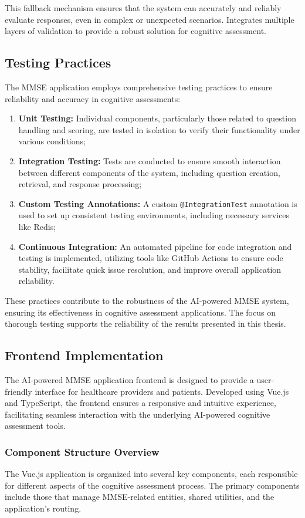 This fallback mechanism ensures that the system can accurately and reliably evaluate responses, even in complex or unexpected scenarios. Integrates multiple layers of validation to provide a robust solution for cognitive assessment.

\subsection{Testing Practices}
The MMSE application employs comprehensive testing practices to ensure reliability and accuracy in cognitive assessments:
\begin{enumerate}
\item \textbf{Unit Testing:} Individual components, particularly those related to question handling and scoring, are tested in isolation to verify their functionality under various conditions;
\item \textbf{Integration Testing:} Tests are conducted to ensure smooth interaction between different components of the system, including question creation, retrieval, and response processing;
\item \textbf{Custom Testing Annotations:} A custom \texttt{@IntegrationTest} annotation is used to set up consistent testing environments, including necessary services like Redis;
\item \textbf{Continuous Integration:} An automated pipeline for code integration and testing is implemented, utilizing tools like GitHub Actions to ensure code stability, facilitate quick issue resolution, and improve overall application reliability.
\end{enumerate}
These practices contribute to the robustness of the AI-powered MMSE system, ensuring its effectiveness in cognitive assessment applications. The focus on thorough testing supports the reliability of the results presented in this thesis.

\subsection{Frontend Implementation}
The AI-powered MMSE application frontend is designed to provide a user-friendly interface for healthcare providers and patients. Developed using Vue.js and TypeScript, the frontend ensures a responsive and intuitive experience, facilitating seamless interaction with the underlying AI-powered cognitive assessment tools.

\subsubsection{Component Structure Overview}
The Vue.js application is organized into several key components, each responsible for different aspects of the cognitive assessment process. The primary components include those that manage MMSE-related entities, shared utilities, and the application's routing.

